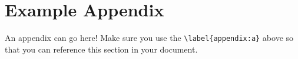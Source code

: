 \section{Example Appendix} \label{appendix:a}

An appendix can go here! Make sure you use the \verb|\label{appendix:a}| above so that you can reference this section in your document.